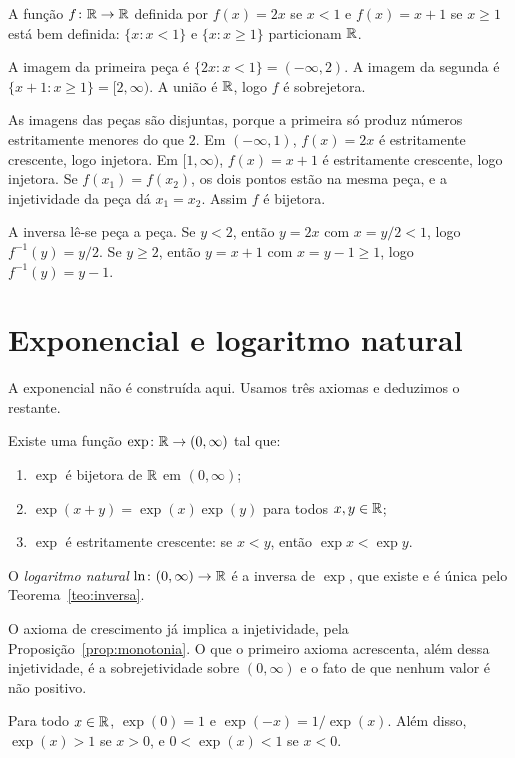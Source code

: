 \documentclass[11pt,a4paper]{article}
\begin{document}
\begin{exemplo}
A função $f\colon\mathbb{R}\to\mathbb{R}$ definida por $f(x)=2x$ se $x<1$ e $f(x)=x+1$ se $x\ge 1$ está bem definida: $\{x:x<1\}$ e $\{x:x\ge 1\}$ particionam $\mathbb{R}$.

A imagem da primeira peça é $\{2x:x<1\}=(-\infty,2)$. A imagem da segunda é $\{x+1:x\ge 1\}=[2,\infty)$. A união é $\mathbb{R}$, logo $f$ é sobrejetora.

As imagens das peças são disjuntas, porque a primeira só produz números estritamente menores do que $2$. Em $(-\infty,1)$, $f(x)=2x$ é estritamente crescente, logo injetora. Em $[1,\infty)$, $f(x)=x+1$ é estritamente crescente, logo injetora. Se $f(x_1)=f(x_2)$, os dois pontos estão na mesma peça, e a injetividade da peça dá $x_1=x_2$. Assim $f$ é bijetora.

A inversa lê-se peça a peça. Se $y<2$, então $y=2x$ com $x=y/2<1$, logo $f^{-1}(y)=y/2$. Se $y\ge 2$, então $y=x+1$ com $x=y-1\ge 1$, logo $f^{-1}(y)=y-1$.
\end{exemplo}

\section{Exponencial e logaritmo natural}

A exponencial não é construída aqui. Usamos três axiomas e deduzimos o restante.

\begin{definicao}\label{def:exp}
Existe uma função $\exp\colon\mathbb{R}\to(0,\infty)$ tal que:
\begin{enumerate}
\item $\exp$ é bijetora de $\mathbb{R}$ em $(0,\infty)$;
\item $\exp(x+y)=\exp(x)\exp(y)$ para todos $x,y\in\mathbb{R}$;
\item $\exp$ é estritamente crescente: se $x<y$, então $\exp x<\exp y$.
\end{enumerate}
O \emph{logaritmo natural} $\ln\colon(0,\infty)\to\mathbb{R}$ é a inversa de $\exp$, que existe e é única pelo Teorema~\ref{teo:inversa}.
\end{definicao}

O axioma de crescimento já implica a injetividade, pela Proposição~\ref{prop:monotonia}. O que o primeiro axioma acrescenta, além dessa injetividade, é a sobrejetividade sobre $(0,\infty)$ e o fato de que nenhum valor é não positivo.

\begin{proposicao}\label{prop:exp-zero}
Para todo $x\in\mathbb{R}$, $\exp(0)=1$ e $\exp(-x)=1/\exp(x)$. Além disso, $\exp(x)>1$ se $x>0$, e $0<\exp(x)<1$ se $x<0$.
\end{proposicao}
\end{document}
